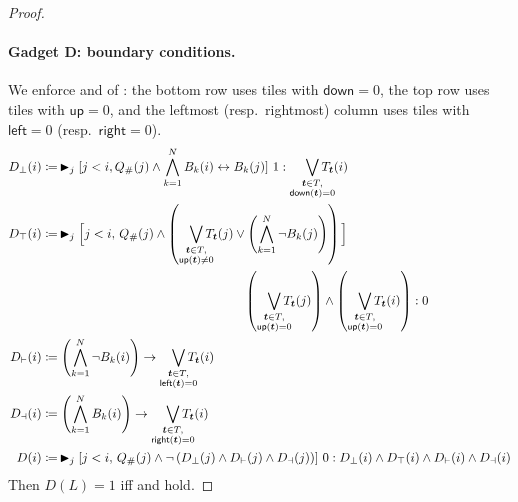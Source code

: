 \documentclass{article} %
\newcommand{\maxatt}{\blacktriangleright}
\newcommand{\tleft}{\mathsf{left}}
\newcommand{\tright}{\mathsf{right}}
\newcommand{\tup}{\mathsf{up}}
\newcommand{\tdown}{\mathsf{down}}
\newcommand{\bnfdef}{\coloneqq}
\newcommand{\sym}[1]{\mathrm{#1}}
\newcommand{\Qprop}[1]{Q_{#1}}
\newcommand{\tile}{\boldsymbol{t}}
\newcommand{\tileset}{T}
\begin{document}
\begin{proof}
\paragraph{Gadget D: boundary conditions.}
We enforce  and  of : the bottom row uses tiles with $\tdown = 0$, the top row uses tiles with $\tup = 0$, and the leftmost (resp.\ rightmost) column uses tiles with $\tleft = 0$ (resp.\ $\tright = 0$).
\begin{subequations}\label{eq:gadget-D}
\begin{align}
D_\bot(i) &\bnfdef\, \maxatt_j[j<i,\Qprop{\sym{\#}}(j) \wedge \bigwedge_{k=1}^N B_k(i) \leftrightarrow B_k(j)]\ 1 : \smashoperator[r]{\bigvee_{\substack{\tile \in \tileset, \\ \tdown(\tile) = 0}}} T_{\tile}(i) \label{eq:D-bot}\\
D_\top(i) &\bnfdef\, \maxatt_j\Big[j<i,\, \Qprop{\sym{\#}}(j) \wedge \left(\smashoperator[r]{\bigvee_{\substack{\tile \in \tileset, \\ \tup(\tile) \ne 0}}} T_{\tile}(j) \vee \left(\bigwedge_{k=1}^N \neg B_k(j)\right)\right)\Big]\notag\\
&\qquad\qquad\qquad\qquad \qquad\qquad\qquad\qquad \left(\smashoperator[r]{\bigvee_{\substack{\tile \in \tileset, \\ \tup(\tile) = 0}}} T_{\tile}(j)\right) \wedge \left(\smashoperator[r]{\bigvee_{\substack{\tile \in \tileset, \\ \tup(\tile) = 0}}} T_{\tile}(i)\right) : 0 \label{eq:D-top}\\
D_\vdash(i) &\bnfdef \left(\bigwedge_{k=1}^N \neg B_k(i)\right) \to \smashoperator[r]{\bigvee_{\substack{\tile \in \tileset, \\ \tleft(\tile) = 0}}} T_{\tile}(i) \label{eq:D-left}\\
D_\dashv(i) &\bnfdef \left(\bigwedge_{k=1}^N B_k(i)\right) \to \smashoperator[r]{\bigvee_{\substack{\tile \in \tileset, \\ \tright(\tile) = 0}}} T_{\tile}(i) \label{eq:D-right}\\
D(i) &\bnfdef\, \maxatt_j[j<i,\, \Qprop{\sym{\#}}(j) \wedge \neg\left(D_\bot(j) \wedge D_\vdash(j) \wedge D_\dashv(j)\right)]\ 0 :  D_\bot(i) \wedge D_\top(i) \wedge D_\vdash(i) \wedge D_\dashv(i) \label{eq:D-final}
\end{align}
\end{subequations}
Then $D(L) = 1$ iff  and  hold.


\end{proof}
\end{document}
